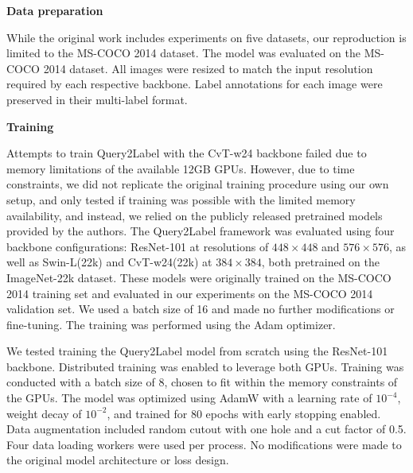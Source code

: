 \documentclass[lettersize,journal]{IEEEtran}
\renewcommand{\paragraph}[1]{%
  \vspace{1.5ex}\textbf{#1}\quad
}
\begin{document}
\paragraph{Data preparation}
While the original work includes experiments on five datasets, our reproduction is limited to the MS-COCO 2014 dataset. The model was evaluated on the MS-COCO 2014 dataset. All images were resized to match the input resolution required by each respective backbone. Label annotations for each image were preserved in their multi-label format.

\paragraph{Training}
Attempts to train Query2Label with the CvT-w24 backbone failed due to memory limitations of the available 12GB GPUs. However, due to time constraints, we did not replicate the original training procedure using our own setup, and only tested if training was possible with the limited memory availability, and instead, we relied on the publicly released pretrained models provided by the authors. The Query2Label framework was evaluated using four backbone configurations: ResNet-101 at resolutions of $448\times448$ and $576\times576$, as well as Swin-L(22k) and CvT-w24(22k) at $384\times384$, both pretrained on the ImageNet-22k \cite{imagenet} dataset. These models were originally trained on the MS-COCO 2014 training set and evaluated in our experiments on the MS-COCO 2014 validation set. We used a batch size of 16 and made no further modifications or fine-tuning. The training was performed using the Adam optimizer. 


We tested training the Query2Label model from scratch using the ResNet-101 backbone. Distributed training was enabled to leverage both GPUs. Training was conducted with a batch size of 8, chosen to fit within the memory constraints of the GPUs. The model was optimized using AdamW with a learning rate of $10^{-4}$, weight decay of $10^{-2}$, and trained for 80 epochs with early stopping enabled. Data augmentation included random cutout with one hole and a cut factor of 0.5. Four data loading workers were used per process. No modifications were made to the original model architecture or loss design.
\end{document}
